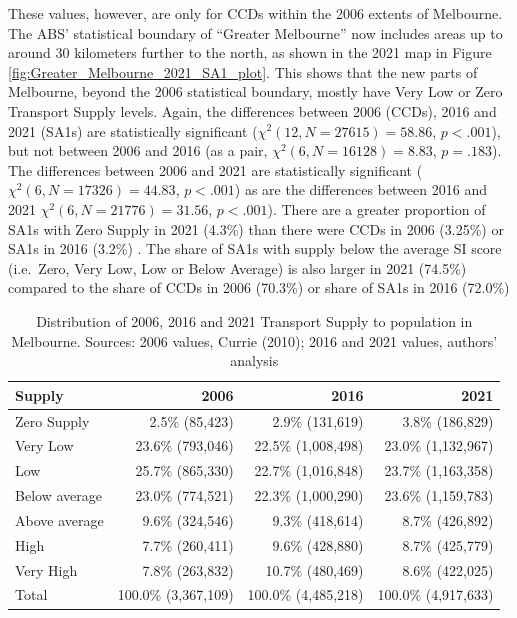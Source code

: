 \documentclass[preprint, 3p,
authoryear]{elsarticle} %
\begin{document}
These values, however, are only for CCDs within the 2006 extents of
Melbourne. The ABS' statistical boundary of ``Greater Melbourne'' now
includes areas up to around 30 kilometers further to the north, as shown
in the 2021 map in Figure \ref{fig:Greater_Melbourne_2021_SA1_plot}.
This shows that the new parts of Melbourne, beyond the 2006 statistical
boundary, mostly have Very Low or Zero Transport Supply levels. Again,
the differences between 2006 (CCDs), 2016 and 2021 (SA1s) are
statistically significant (\(\chi^2(12, N = 27615) = 58.86\),
\(p < .001\)), but not between 2006 and 2016 (as a pair,
\(\chi^2(6, N = 16128) = 8.83\), \(p = .183\)). The differences between
2006 and 2021 are statistically significant
(\(\chi^2(6, N = 17326) = 44.83\), \(p < .001\)) as are the differences
between 2016 and 2021 \(\chi^2(6, N = 21776) = 31.56\), \(p < .001\)).
There are a greater proportion of SA1s with Zero Supply in 2021 (4.3\%)
than there were CCDs in 2006 (3.25\%) or SA1s in 2016 (3.2\%) . The
share of SA1s with supply below the average SI score (i.e.~Zero, Very
Low, Low or Below Average) is also larger in 2021 (74.5\%) compared to
the share of CCDs in 2006 (70.3\%) or share of SA1s in 2016 (72.0\%)

\begin{table}

\caption{\label{tab:Greater_Melbourne_CCDs_SA1_population}Distribution of 2006, 2016 and 2021 Transport Supply to population in Melbourne. Sources: 2006 values, Currie (2010); 2016 and 2021 values, authors' analysis}
\centering
\begin{tabular}[t]{l|r|r|r}
\hline
Supply & 2006 & 2016 & 2021\\
\hline
Zero Supply & 2.5\%    (85,423) & 2.9\%   (131,619) & 3.8\%   (186,829)\\
\hline
Very Low & 23.6\%   (793,046) & 22.5\% (1,008,498) & 23.0\% (1,132,967)\\
\hline
Low & 25.7\%   (865,330) & 22.7\% (1,016,848) & 23.7\% (1,163,358)\\
\hline
Below average & 23.0\%   (774,521) & 22.3\% (1,000,290) & 23.6\% (1,159,783)\\
\hline
Above average & 9.6\%   (324,546) & 9.3\%   (418,614) & 8.7\%   (426,892)\\
\hline
High & 7.7\%   (260,411) & 9.6\%   (428,880) & 8.7\%   (425,779)\\
\hline
Very High & 7.8\%   (263,832) & 10.7\%   (480,469) & 8.6\%   (422,025)\\
\hline
Total & 100.0\% (3,367,109) & 100.0\% (4,485,218) & 100.0\% (4,917,633)\\
\hline
\end{tabular}
\end{table}
\end{document}
